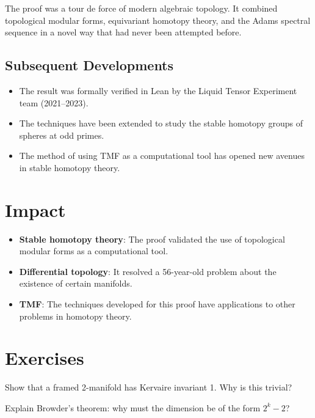 \begin{highlightbox}
The proof was a tour de force of modern algebraic topology. It combined topological modular forms, equivariant homotopy theory, and the Adams spectral sequence in a novel way that had never been attempted before.
\end{highlightbox}

\subsection{Subsequent Developments}

\begin{itemize}
\item The result was formally verified in Lean by the Liquid Tensor Experiment team (2021--2023).
\item The techniques have been extended to study the stable homotopy groups of spheres at odd primes.
\item The method of using TMF as a computational tool has opened new avenues in stable homotopy theory.
\end{itemize}

\section{Impact}

\begin{itemize}
\item \textbf{Stable homotopy theory}: The proof validated the use of topological modular forms as a computational tool.
\item \textbf{Differential topology}: It resolved a 56-year-old problem about the existence of certain manifolds.
\item \textbf{TMF}: The techniques developed for this proof have applications to other problems in homotopy theory.
\end{itemize}

\section{Exercises}

\begin{exercise}[Basic]
Show that a framed 2-manifold has Kervaire invariant 1. Why is this trivial?
\end{exercise}

\begin{exercise}[Intermediate]
Explain Browder's theorem: why must the dimension be of the form $2^k - 2$?
\end{exercise}


